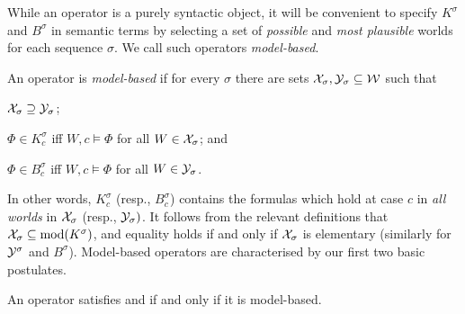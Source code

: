 While an operator is a purely syntactic object, it will be convenient to
specify $K^\sigma$ and $B^\sigma$ in semantic terms by selecting a set of
\emph{possible} and \emph{most plausible} worlds for each sequence $\sigma$.
We call such operators \emph{model-based}.

\begin{definition}
\label{def:model_based}
An operator is \emph{model-based} if for every $\sigma$ there
are sets $\mathcal{X}_\sigma, \mathcal{Y}_\sigma \subseteq \mathcal{W}$ such that
\begin{inlinelist}
    \item $\mathcal{X}_\sigma \supseteq \mathcal{Y}_\sigma$;
    \item $\Phi \in K^\sigma_c$ iff $W, c \models \Phi$ for all $W \in
          \mathcal{X}_\sigma$; and
    \item $\Phi \in B^\sigma_c$ iff $W, c \models \Phi$ for all $W \in
          \mathcal{Y}_\sigma$.
\end{inlinelist}
\end{definition}

In other words, $K^\sigma_c$ (resp., $B^\sigma_c$) contains the formulas which
hold at case $c$ in \emph{all worlds} in $\mathcal{X}_\sigma$ (resp., $\mathcal{Y}_\sigma)$. It
follows from the relevant definitions that $\mathcal{X}_\sigma \subseteq
\operatorname{mod}(K^\sigma)$, and equality holds if and only if $\mathcal{X}_\sigma$ is elementary
(similarly for $\mathcal{Y}^\sigma$ and $B^\sigma$).
%
Model-based operators are characterised by our first two basic postulates.

\begin{theorem}
\label{thm:model_based_characterisation}
An operator satisfies \closure{} and \containment{} if and only if it
is model-based.
\end{theorem}

